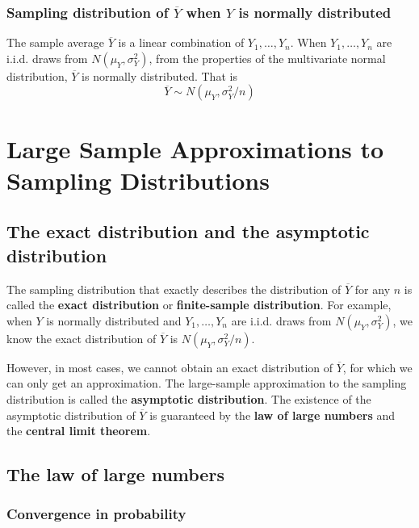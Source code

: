 \documentclass[a4paper,11pt]{article}
\begin{document}
\subsubsection*{Sampling distribution of \(\overline{Y}\) when \(Y\) is normally distributed}
\label{sec:org1dc5395}

The sample average \(\overline{Y}\) is a linear combination of \(Y_1,
\ldots, Y_n\). When \(Y_1, \ldots, Y_n\) are i.i.d. draws from \(N(\mu_Y,
\sigma^2_Y)\), from the properties of the multivariate normal
distribution, \(\overline{Y}\) is normally distributed. That is 
\[ \overline{Y} \sim N(\mu_Y, \sigma^2_Y/n) \]


\section{Large Sample Approximations to Sampling Distributions}
\label{sec:orgd5fc017}

\subsection{The exact distribution and the asymptotic distribution}
\label{sec:orgfcfb033}

The sampling distribution that exactly describes the distribution of
\(\overline{Y}\) for any \(n\) is called the \textbf{exact distribution} or
\textbf{finite-sample distribution}. For example, when \(Y\) is normally
distributed and \(Y_1, \ldots, Y_n\) are i.i.d. draws from \(N(\mu_Y,
\sigma^2_Y)\), we know the exact distribution of \(\overline{Y}\) is
\(N(\mu_Y, \sigma^2_Y/n)\). 

However, in most cases, we cannot obtain an exact distribution of
\(\overline{Y}\), for which we can only get an approximation. The
large-sample approximation to the sampling distribution is called the
\textbf{asymptotic distribution}. The existence of the asymptotic
distribution of \(\overline{Y}\) is guaranteed by the \textbf{law of large
numbers} and the \textbf{central limit theorem}. 

\subsection{The law of large numbers}
\label{sec:org1372e57}

\subsubsection*{Convergence in probability}
\label{sec:orgece893c}
\end{document}
